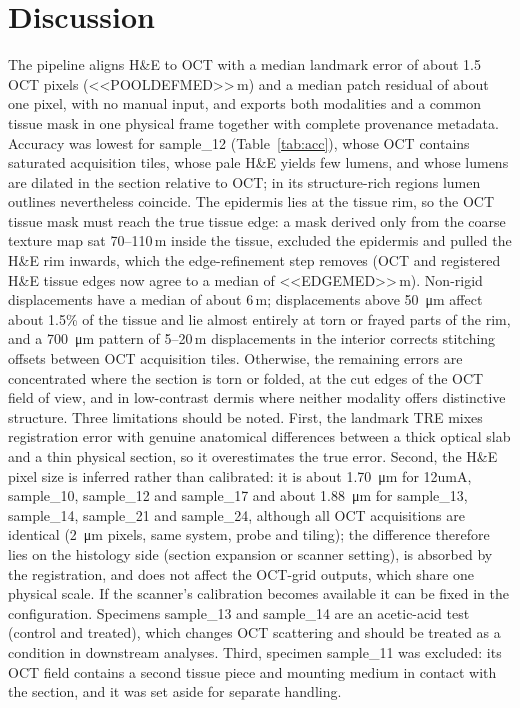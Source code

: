 \documentclass[9pt,twocolumn]{extarticle}
\begin{document}
\section{Discussion}
The pipeline aligns H\&E to OCT with a median landmark error of about 1.5 OCT pixels (<<POOLDEFMED>>\,\textmu m) and a median patch residual of about one pixel, with no manual input, and exports both modalities and a common tissue mask in one physical frame together with complete provenance metadata. Accuracy was lowest for sample\_12 (Table~\ref{tab:acc}), whose OCT contains saturated acquisition tiles, whose pale H\&E yields few lumens, and whose lumens are dilated in the section relative to OCT; in its structure-rich regions lumen outlines nevertheless coincide. The epidermis lies at the tissue rim, so the OCT tissue mask must reach the true tissue edge: a mask derived only from the coarse texture map sat 70--110\,\textmu m inside the tissue, excluded the epidermis and pulled the H\&E rim inwards, which the edge-refinement step removes (OCT and registered H\&E tissue edges now agree to a median of <<EDGEMED>>\,\textmu m). Non-rigid displacements have a median of about 6\,\textmu m; displacements above \SI{50}{\micro\metre} affect about 1.5\% of the tissue and lie almost entirely at torn or frayed parts of the rim, and a \SI{700}{\micro\metre} pattern of 5--20\,\textmu m displacements in the interior corrects stitching offsets between OCT acquisition tiles. Otherwise, the remaining errors are concentrated where the section is torn or folded, at the cut edges of the OCT field of view, and in low-contrast dermis where neither modality offers distinctive structure. Three limitations should be noted. First, the landmark TRE mixes registration error with genuine anatomical differences between a thick optical slab and a thin physical section, so it overestimates the true error. Second, the H\&E pixel size is inferred rather than calibrated: it is about \SI{1.70}{\micro\metre} for 12umA, sample\_10, sample\_12 and sample\_17 and about \SI{1.88}{\micro\metre} for sample\_13, sample\_14, sample\_21 and sample\_24, although all OCT acquisitions are identical (\SI{2}{\micro\metre} pixels, same system, probe and tiling); the difference therefore lies on the histology side (section expansion or scanner setting), is absorbed by the registration, and does not affect the OCT-grid outputs, which share one physical scale. If the scanner's calibration becomes available it can be fixed in the configuration. Specimens sample\_13 and sample\_14 are an acetic-acid test (control and treated), which changes OCT scattering and should be treated as a condition in downstream analyses. Third, specimen sample\_11 was excluded: its OCT field contains a second tissue piece and mounting medium in contact with the section, and it was set aside for separate handling.
\end{document}
